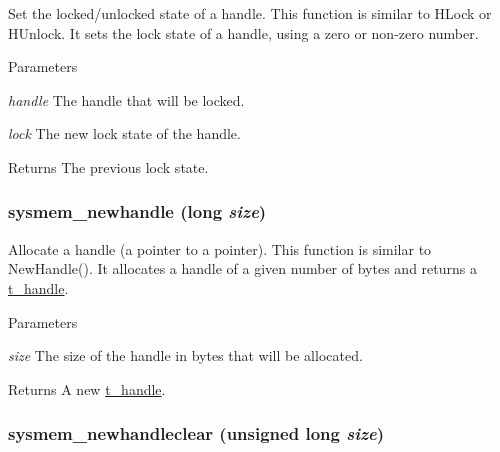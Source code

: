 Set the locked/unlocked state of a handle. This function is similar to HLock or HUnlock. It sets the lock state of a handle, using a zero or non-\/zero number.


\begin{DoxyParams}{Parameters}
\item[{\em handle}]The handle that will be locked. \item[{\em lock}]The new lock state of the handle. \end{DoxyParams}
\begin{DoxyReturn}{Returns}
The previous lock state. 
\end{DoxyReturn}
\hypertarget{group__memory_gacdacfad4785c71dc8c4ce5d4d9714d54}{
\subsubsection[{sysmem\_\-newhandle}]{ sysmem\_\-newhandle (long {\em size})}}
\label{group__memory_gacdacfad4785c71dc8c4ce5d4d9714d54}


Allocate a handle (a pointer to a pointer). This function is similar to NewHandle(). It allocates a handle of a given number of bytes and returns a \hyperlink{group__datatypes_ga0fe64aac41fd3ec071cce295a41d67ad}{t\_\-handle}.


\begin{DoxyParams}{Parameters}
\item[{\em size}]The size of the handle in bytes that will be allocated. \end{DoxyParams}
\begin{DoxyReturn}{Returns}
A new \hyperlink{group__datatypes_ga0fe64aac41fd3ec071cce295a41d67ad}{t\_\-handle}. 
\end{DoxyReturn}
\hypertarget{group__memory_ga56406e70880d954e3d51b87e606c1398}{
\subsubsection[{sysmem\_\-newhandleclear}]{ sysmem\_\-newhandleclear (unsigned long {\em size})}}
\label{group__memory_ga56406e70880d954e3d51b87e606c1398}


